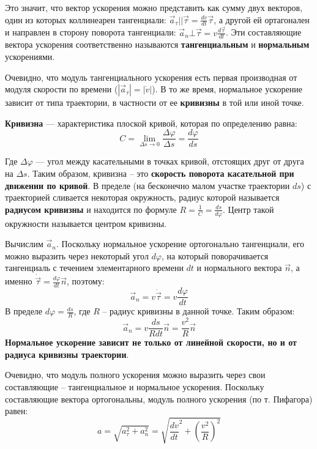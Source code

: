 \documentclass{article}
\begin{document}
    \par
      Это значит, что вектор ускорения можно представить как сумму двух векторов, один из которых коллинеарен тангенциали: $\vec a_\tau || \vec\tau = \frac{dv}{dt}\vec\tau$, а другой ей ортагонален и направлен в сторону поворота тангенциали: $\vec a_n\bot\vec\tau=v\frac{d\vec\tau}{dt}$. Эти составляющие вектора ускорения соответственно называются \textbf{тангенциальным} и \textbf{нормальным} ускорениями.
    \par
      Очевидно, что модуль тангенциального ускорения есть первая производная от модуля скорости по времени ($|\vec a_\tau|=|\dot{v}|$). В то же время, нормальное ускорение зависит от типа траектории, в частности от ее \textbf{кривизны} в той или иной точке.
    \par
      \textbf{Кривизна} --- характеристика плоской кривой, которая по определению равна:
      \begin{equation}
	C=\lim_{\Delta s\rightarrow 0}\frac{\Delta \varphi}{\Delta s}=\frac{d\varphi}{ds}
      \end{equation}
    \par
      Где $\Delta\varphi$ --- угол между касательными в точках кривой, отстоящих друг от друга на $\Delta s$. Таким образом, кривизна -- это \textbf{скорость поворота касательной при движении по кривой}. В пределе (на бесконечно малом участке траектории $ds$) с траекторией сливается некоторая окружность, радиус которой называется \textbf{радиусом кривизны} и находится по формуле $R=\frac{1}{C}=\frac{ds}{d\varphi}$. Центр такой окружности называется центром кривизны.
    \par
      Вычислим $\vec a_n$. Поскольку нормальное ускорение ортогонально тангенциали, его можно выразить через некоторый угол $d\varphi$, на который поворачивается тангенциаль с течением элементарного времени $dt$ и нормального вектора $\vec n$, а именно $\dot{\vec\tau}=\frac{d\varphi}{dt}\vec n$, поэтому:
      \begin{equation}
	\vec a_n=v\dot{\vec\tau}=v\frac{d\varphi}{dt}
      \end{equation}
      В пределе $d\varphi=\frac{ds}{R}$, где $R$ -- радиус кривизны в данной точке. Таким образом:
      \begin{equation}
	\vec a_n=v\frac{ds}{Rdt}\vec n=\frac{v^2}{R}\vec n
      \end{equation}
      \textbf{Нормальное ускорение зависит не только от линейной скорости, но и от радиуса кривизны траектории}.
    \par
      Очевидно, что модуль полного ускорения можно выразить через свои составляющие -- тангенциальное и нормальное ускорения. Поскольку составляющие вектора ортогональны, модуль полного ускорения (по т. Пифагора) равен:
      \begin{equation}
	a=\sqrt{a_\tau^2+a_n^2}=\sqrt{{\frac{dv}{dt}}^2+(\frac{v^2}{R})^2}
      \end{equation}
  \clearpage
    
\end{document}
